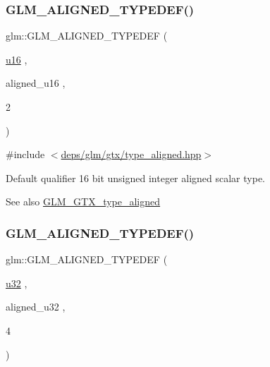 \subsubsection{\texorpdfstring{G\+L\+M\+\_\+\+A\+L\+I\+G\+N\+E\+D\+\_\+\+T\+Y\+P\+E\+D\+E\+F()}{GLM\_ALIGNED\_TYPEDEF()}\hspace{0.1cm}{\footnotesize\ttfamily [114/209]}}
{\footnotesize\ttfamily glm\+::\+G\+L\+M\+\_\+\+A\+L\+I\+G\+N\+E\+D\+\_\+\+T\+Y\+P\+E\+D\+EF (\begin{DoxyParamCaption}\item[{\hyperlink{group__gtc__type__precision_gae7a1571503f83d2264ddfa705a6b082a}{u16}}]{,  }\item[{aligned\+\_\+u16}]{,  }\item[{2}]{ }\end{DoxyParamCaption})}



{\ttfamily \#include $<$\hyperlink{gtx_2type__aligned_8hpp}{deps/glm/gtx/type\+\_\+aligned.\+hpp}$>$}

Default qualifier 16 bit unsigned integer aligned scalar type. \begin{DoxySeeAlso}{See also}
\hyperlink{group__gtx__type__aligned}{G\+L\+M\+\_\+\+G\+T\+X\+\_\+type\+\_\+aligned} 
\end{DoxySeeAlso}
\mbox{\label{group__gtx__type__aligned_ga197570e03acbc3d18ab698e342971e8f}} 
\subsubsection{\texorpdfstring{G\+L\+M\+\_\+\+A\+L\+I\+G\+N\+E\+D\+\_\+\+T\+Y\+P\+E\+D\+E\+F()}{GLM\_ALIGNED\_TYPEDEF()}\hspace{0.1cm}{\footnotesize\ttfamily [115/209]}}
{\footnotesize\ttfamily glm\+::\+G\+L\+M\+\_\+\+A\+L\+I\+G\+N\+E\+D\+\_\+\+T\+Y\+P\+E\+D\+EF (\begin{DoxyParamCaption}\item[{\hyperlink{group__gtc__type__precision_ga54e837745059fd29017bed71cfa0a8db}{u32}}]{,  }\item[{aligned\+\_\+u32}]{,  }\item[{4}]{ }\end{DoxyParamCaption})}



